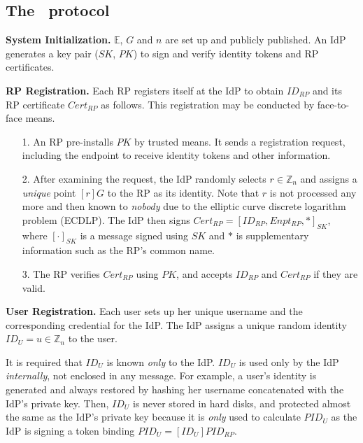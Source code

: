 \subsection{The \usso\ protocol}
\label{implementations}

\noindent \textbf{System Initialization.}
$\mathbb{E}$, $G$ and $n$ are set up and publicly published.
An IdP generates a key pair ($SK$, $PK$) to sign and verify identity tokens and RP certificates.

\vspace{1mm}
\noindent\textbf{RP Registration.}
Each RP registers itself at the IdP to obtain $ID_{RP}$ and its RP certificate $Cert_{RP}$ as follows.
This registration may be conducted by face-to-face means.
\vspace{-\topsep}\begin{enumerate}
\setlength{\topsep}{0pt}
\setlength{\partopsep}{0pt}
\setlength{\itemsep}{0pt}
\setlength{\parsep}{0pt}
\setlength{\parskip}{0pt}
\item[1.]
An RP pre-installs $PK$ by trusted means.
It sends a registration request, including the endpoint to receive identity tokens and other information.
\item[2.]
After examining the request,
the IdP randomly selects $r \in \mathbb{Z}_n$
        and assigns a \emph{unique} point $[r]G$ to the RP as its identity.
Note that $r$ is not processed any more and then known to \emph{nobody}
 due to the elliptic curve discrete logarithm problem (ECDLP).
The IdP then signs $Cert_{RP} = [ID_{RP}, Enpt_{RP}, *]_{SK}$,
     where $[\cdot]_{SK}$ is a message signed using $SK$ and $*$ is supplementary information such as the RP's common name.
\item[3.]
The RP verifies $Cert_{RP}$ using $PK$, and accepts $ID_{RP}$ and $Cert_{RP}$ if they are valid.
\end{enumerate}

\noindent\textbf{User Registration.}
Each user sets up her unique username and the corresponding credential for the IdP.
The IdP assigns
a unique random identity $ID_U = u\in \mathbb{Z}_n$ to the user.

It is required that $ID_U$ is known \emph{only} to the IdP.
$ID_U$ is used only by the IdP \emph{internally},
 not enclosed in any message.
For example, a user's identity is generated and always restored by hashing her username concatenated with the IdP's private key.
Then,
 $ID_U$ is never stored in hard disks,
 and protected almost the same as the IdP's private key
because it is \emph{only} used to calculate $PID_{U}$ as the IdP is signing a token binding $PID_{U}=
  [{ID_U}]{PID_{RP}}$.

